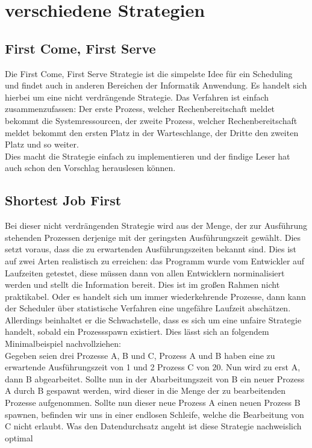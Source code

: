 \section{verschiedene Strategien}
\subsection{First Come, First Serve}
Die First Come, First Serve Strategie ist die simpelste Idee für ein Scheduling und findet auch in anderen Bereichen der Informatik Anwendung. Es handelt sich hierbei um eine nicht verdrängende Strategie.
Das Verfahren ist einfach zusammenzufassen: Der erste Prozess, welcher Rechenbereitschaft meldet bekommt die Systemressourcen, der zweite Prozess, welcher Rechenbereitschaft meldet bekommt den ersten Platz in der Warteschlange, der Dritte den zweiten Platz und so weiter. \\
Dies macht die Strategie einfach zu implementieren und der findige Leser hat auch schon den Vorschlag herauslesen können. 
\\

\subsection{Shortest Job First}
Bei dieser nicht verdrängenden Strategie wird aus der Menge, der zur Ausführung stehenden Prozessen derjenige mit der geringsten Ausführungszeit gewählt. Dies setzt voraus, dass die zu erwartenden Ausführungszeiten bekannt sind. Dies ist auf zwei Arten realistisch zu erreichen: das Programm wurde vom Entwickler auf Laufzeiten getestet, diese müssen dann von allen Entwicklern norminalisiert werden und stellt die Information bereit. Dies ist im großen Rahmen nicht praktikabel. Oder es handelt sich um immer wiederkehrende Prozesse, dann kann der Scheduler über statistische Verfahren eine ungefähre Laufzeit abschätzen. \\
Allerdings beinhaltet er die Schwachstelle, dass es sich um eine unfaire Strategie handelt, sobald ein Prozessspawn existiert. Dies lässt sich an folgendem Minimalbeispiel nachvollziehen: \\
Gegeben seien drei Prozesse A, B und C, Prozess A und B haben eine zu erwartende Ausführungszeit von 1 und 2 Prozess C von 20. Nun wird zu erst A, dann B abgearbeitet. Sollte nun in der Abarbeitungszeit von B ein neuer Prozess A durch B gespawnt werden, wird dieser in die Menge der zu bearbeitenden Prozesse aufgenommen. Sollte nun dieser neue Prozess A einen neuen Prozess B spawnen, befinden wir uns in einer endlosen Schleife, welche die Bearbeitung von C nicht erlaubt.
Was den Datendurchsatz angeht ist diese Strategie nachweislich optimal \cite{tanenb2009}
\\



